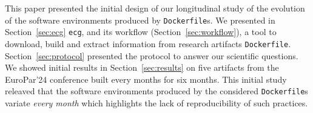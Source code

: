\documentclass[sigconf,natbib=false]{acmart}
\newcommand{\ie}{\emph{i.e.,}}
\newcommand{\df}{\texttt{Dockerfile}}
\newcommand{\ecg}{\texttt{ecg}}
\begin{document}
% 
% 
% 
% 
% 
% 


This paper presented the initial design of our longitudinal study of the evolution of the software environments produced by \df s.
We presented in Section~\ref{sec:ecg} \ecg, and its workflow (Section~\ref{sec:workflow}), a tool to download, build and extract information from research artifacts \df.
Section~\ref{sec:protocol} presented the protocol to answer our scientific questions.
We showed initial results in Section~\ref{sec:results} on five artifacts from the EuroPar'24 conference built every months for six months.
This initial study releaved that the software environments produced by the considered \df s variate \emph{every month} which highlights the lack of reproducibility of such practices.
\end{document}
